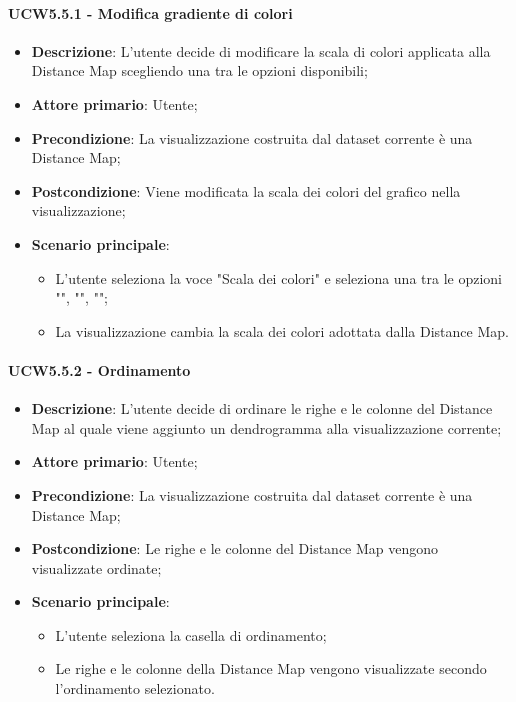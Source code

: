 \paragraph{UCW5.5.1 - Modifica gradiente di colori}
\label{par:ucw5.5.1}
\begin{itemize}
    \item \textbf{Descrizione}: L'utente decide di modificare la scala di colori applicata alla Distance Map scegliendo una tra le opzioni disponibili;
    \item \textbf{Attore primario}: Utente;
    \item \textbf{Precondizione}: La visualizzazione costruita dal dataset corrente è una Distance Map;
    \item \textbf{Postcondizione}: Viene modificata la scala dei colori del grafico nella visualizzazione;
    \item \textbf{Scenario principale}:
          \begin{itemize}
              \item L'utente seleziona la voce "Scala dei colori" e seleziona una tra le opzioni  "", "", "";
              \item La visualizzazione cambia la scala dei colori adottata dalla Distance Map.
          \end{itemize}
\end{itemize}

\paragraph{UCW5.5.2 - Ordinamento}
\label{par:ucw5.5.2}
\begin{itemize}
    \item \textbf{Descrizione}: L'utente decide di ordinare le righe e le colonne del Distance Map al quale viene aggiunto un dendrogramma alla visualizzazione corrente;
    \item \textbf{Attore primario}: Utente;
    \item \textbf{Precondizione}: La visualizzazione costruita dal dataset corrente è una Distance Map;
    \item \textbf{Postcondizione}: Le righe e le colonne del Distance Map vengono visualizzate ordinate;
    \item \textbf{Scenario principale}:
          \begin{itemize}
              \item L'utente seleziona la casella di ordinamento;
              \item Le righe e le colonne della Distance Map vengono visualizzate secondo l'ordinamento selezionato.
          \end{itemize}
\end{itemize}

